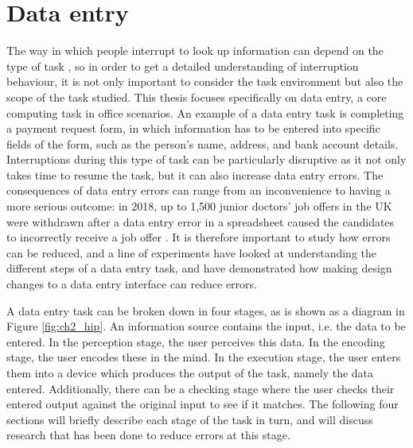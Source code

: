 \section{Data entry}
The way in which people interrupt to look up information can depend on the type of task \citep{Bondarenko2005}, so in order to get a detailed understanding of interruption behaviour, it is not only important to consider the task environment but also the scope of the task studied. This thesis focuses specifically on data entry, a core computing task in office scenarios. An example of a data entry task is completing a payment request form, in which information has to be entered into specific fields of the form, such as the person's name, address, and bank account details. Interruptions during this type of task can be particularly disruptive as it not only takes time to resume the task, but it can also increase data entry errors. The consequences of data entry errors can range from an inconvenience to having a more serious outcome: in 2018, up to 1,500 junior doctors' job offers in the UK were withdrawn after a data entry error in a spreadsheet caused the candidates to incorrectly receive a job offer \citep{BBC2018}. It is therefore important to study how errors can be reduced, and a line of experiments have looked at understanding the different steps of a data entry task, and have demonstrated how making design changes to a data entry interface can reduce errors. 
 

A data entry task can be broken down in four stages, as is shown as a diagram in Figure \ref{fig:ch2_hip}. An information source contains the input, i.e. the data to be entered. In the perception stage, the user perceives this data. In the encoding stage, the user encodes these in the mind. In the execution stage, the user enters them into a device which produces the output of the task, namely the data entered. Additionally, there can be a checking stage where the user checks their entered output against the original input to see if it matches. The following four sections will briefly describe each stage of the task in turn, and will discuss research that has been done to reduce errors at this stage. 

